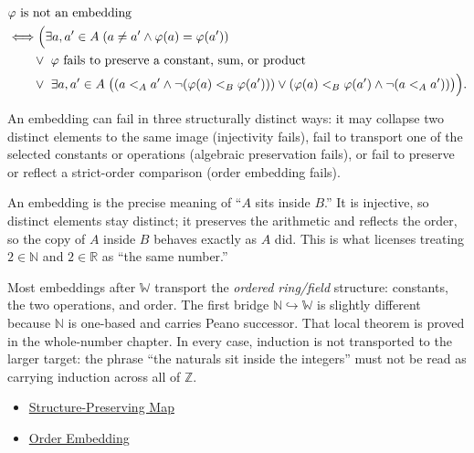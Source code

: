 \begin{remark*}
\[
\begin{aligned}
&\varphi \text{ is not an embedding}\\
&\Longleftrightarrow
\Bigl(\exists a,a'\in A\;(a\neq a'\land \varphi(a)=\varphi(a'))\\
&\qquad\lor\ \varphi \text{ fails to preserve a constant, sum, or product}\\
&\qquad\lor\ \exists a,a'\in A\;\bigl((a<_A a'\land \neg(\varphi(a)<_B\varphi(a')))
\lor(\varphi(a)<_B\varphi(a')\land \neg(a<_A a'))\bigr)\Bigr).
\end{aligned}
\]
\end{remark*}
\begin{remark*}
An embedding can fail in three structurally distinct ways: it may collapse two distinct elements to the same image (injectivity fails), fail to transport one of the selected constants or operations (algebraic preservation fails), or fail to preserve or reflect a strict-order comparison (order embedding fails).
\end{remark*}
\begin{remark*}[Interpretation]
An embedding is the precise meaning of ``$A$ sits inside $B$.'' It is injective, so distinct elements stay distinct; it preserves the arithmetic and reflects the order, so the copy of $A$ inside $B$ behaves exactly as $A$ did. This is what licenses treating $2\in\mathbb{N}$ and $2\in\mathbb{R}$ as ``the same number.''
\end{remark*}
\begin{remark*}[Interpretation]
Most embeddings after $\mathbb{W}$ transport the \emph{ordered ring/field}
structure: constants, the two operations, and order. The first bridge
$\mathbb{N}\hookrightarrow\mathbb{W}$ is slightly different because
$\mathbb{N}$ is one-based and carries Peano successor. That local theorem is
proved in the whole-number chapter. In every case, induction is not transported
to the larger target: the phrase ``the naturals sit inside the integers'' must
not be read as carrying induction across all of $\mathbb{Z}$.
\end{remark*}
\begin{dependencies}
\begin{itemize}
  \item \hyperref[def:structure-preserving-map]{Structure-Preserving Map}
  \item \hyperref[def:order-embedding]{Order Embedding}
\end{itemize}
\end{dependencies}
